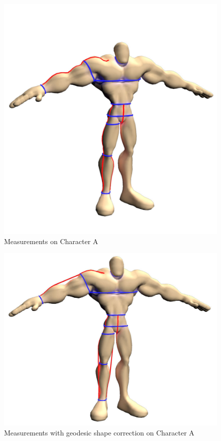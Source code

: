 \begin{figure}[H]
\includegraphics[width=\textwidth]{../images/geodesic_image/A_measurement}
\caption{Measurements on Character A}
\label{figure:A_all_measurement} 
\end{figure}

\begin{figure}[H]
\includegraphics[width=\textwidth]{../images/geodesic_image/hulk_correction}
\caption{Measurements with geodesic shape correction on Character A}
\label{figure:A_all_corrected_measurement} 
\end{figure}



